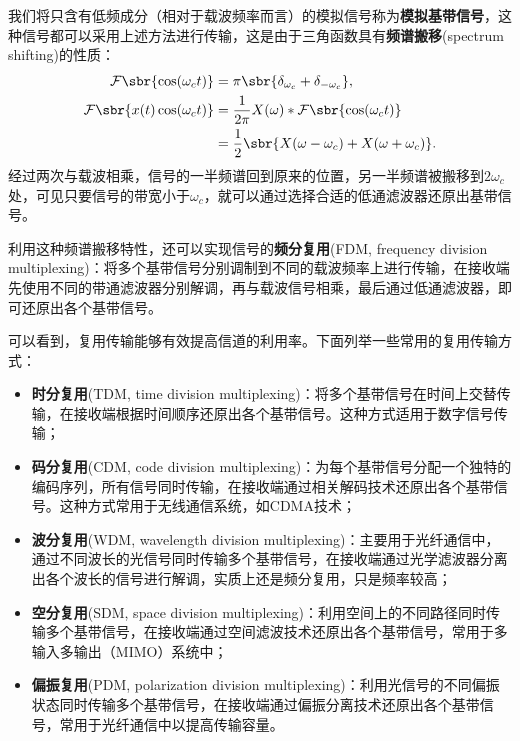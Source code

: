 我们将只含有低频成分（相对于载波频率而言）的模拟信号称为\textbf{模拟基带信号}，这种信号都可以采用上述方法进行传输，这是由于三角函数具有\textbf{频谱搬移}(spectrum shifting)的性质：
\begin{align}
    \mathcal{F}\sbr{\cos(\omega_c t)}&=\pi\sbr{\delta_{\omega_c}+\delta_{-\omega_c}},\\
    \mathcal{F}\sbr{x(t)\cos(\omega_c t)}&=\frac{1}{2\pi}X(\omega)*\mathcal{F}\sbr{\cos(\omega_c t)}\nonumber\\
    &=\frac{1}{2}\sbr{X(\omega-\omega_c)+X(\omega+\omega_c)}.
\end{align}
经过两次与载波相乘，信号的一半频谱回到原来的位置，另一半频谱被搬移到$2\omega_c$处，可见只要信号的带宽小于$\omega_c$，就可以通过选择合适的低通滤波器还原出基带信号。

利用这种频谱搬移特性，还可以实现信号的\textbf{频分复用}(FDM, frequency division multiplexing)：将多个基带信号分别调制到不同的载波频率上进行传输，在接收端先使用不同的带通滤波器分别解调，再与载波信号相乘，最后通过低通滤波器，即可还原出各个基带信号。

可以看到，复用传输能够有效提高信道的利用率。下面列举一些常用的复用传输方式：
\begin{itemize}
    \item \textbf{时分复用}(TDM, time division multiplexing)：将多个基带信号在时间上交替传输，在接收端根据时间顺序还原出各个基带信号。这种方式适用于数字信号传输；
    \item \textbf{码分复用}(CDM, code division multiplexing)：为每个基带信号分配一个独特的编码序列，所有信号同时传输，在接收端通过相关解码技术还原出各个基带信号。这种方式常用于无线通信系统，如CDMA技术；
    \item \textbf{波分复用}(WDM, wavelength division multiplexing)：主要用于光纤通信中，通过不同波长的光信号同时传输多个基带信号，在接收端通过光学滤波器分离出各个波长的信号进行解调，实质上还是频分复用，只是频率较高；
    \item \textbf{空分复用}(SDM, space division multiplexing)：利用空间上的不同路径同时传输多个基带信号，在接收端通过空间滤波技术还原出各个基带信号，常用于多输入多输出（MIMO）系统中；
    \item \textbf{偏振复用}(PDM, polarization division multiplexing)：利用光信号的不同偏振状态同时传输多个基带信号，在接收端通过偏振分离技术还原出各个基带信号，常用于光纤通信中以提高传输容量。
\end{itemize}
